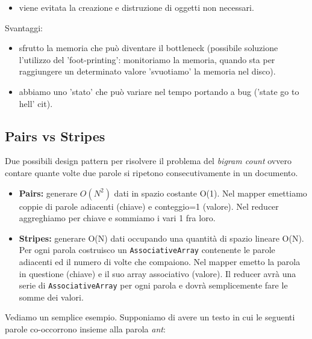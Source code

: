 \documentclass{article}
\begin{document}
\begin{appendices}
\begin{itemize}
    \item viene evitata la creazione e distruzione di oggetti non necessari.
\end{itemize}
Svantaggi:
\begin{itemize}
    \item sfrutto la memoria che può diventare il bottleneck (possibile soluzione l'utilizzo del 'foot-printing': monitoriamo la memoria, quando sta per raggiungere un determinato valore 'svuotiamo' la memoria nel disco).
    \item abbiamo uno 'stato' che può variare nel tempo portando a bug ('state go to hell' cit).
\end{itemize}

\subsection{Pairs vs Stripes}
Due possibili design pattern per risolvere il problema del \textit{bigram count} ovvero contare quante volte due parole si ripetono consecutivamente in un documento.
\begin{itemize}
    \item \textbf{Pairs:} generare $O(N^2)$ dati in spazio costante O(1). Nel mapper emettiamo coppie di parole adiacenti (chiave) e conteggio=1 (valore). Nel reducer aggreghiamo per chiave e sommiamo i vari 1 fra loro.
    \item \textbf{Stripes:} generare O(N) dati occupando una quantità di spazio lineare O(N). Per ogni parola costruisco un \texttt{AssociativeArray} contenente le parole adiacenti ed il numero di volte che compaiono. Nel mapper emetto la parola in questione (chiave) e il suo array associativo (valore). Il reducer avrà una serie di \texttt{AssociativeArray} per ogni parola e dovrà semplicemente fare le somme dei valori.
\end{itemize}
Vediamo un semplice esempio. Supponiamo di avere un testo in cui le seguenti parole co-occorrono insieme alla parola \textit{ant}:\\


\end{appendices}
\end{document}
